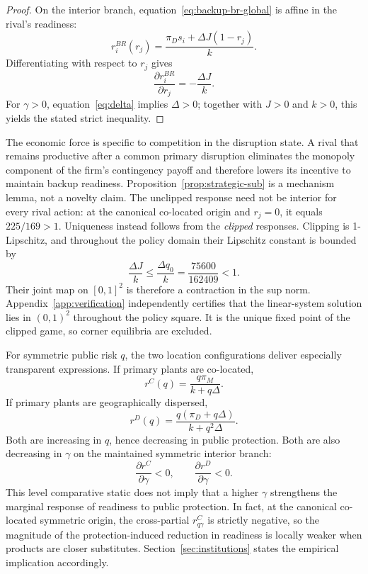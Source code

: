 \begin{proof}
On the interior branch, equation~\eqref{eq:backup-br-global} is affine in the rival's readiness:
\[
r_i^{BR}(r_j)
=
\frac{\pi_D s_i+\Delta J(1-r_j)}{k}.
\]
Differentiating with respect to $r_j$ gives
\[
\frac{\partial r_i^{BR}}{\partial r_j}
=
-\frac{\Delta J}{k}.
\]
For $\gamma>0$, equation~\eqref{eq:delta} implies $\Delta>0$; together with $J>0$ and $k>0$, this yields the stated strict inequality.
\end{proof}

The economic force is specific to competition in the disruption state. A rival that remains productive after a common primary disruption eliminates the monopoly component of the firm's contingency payoff and therefore lowers its incentive to maintain backup readiness. Proposition~\ref{prop:strategic-sub} is a mechanism lemma, not a novelty claim. The unclipped response need not be interior for every rival action: at the canonical co-located origin and $r_j=0$, it equals $225/169>1$. Uniqueness instead follows from the \emph{clipped} responses. Clipping is 1-Lipschitz, and throughout the policy domain their Lipschitz constant is bounded by
\begin{equation}
\frac{\Delta J}{k}\leq\frac{\Delta q_0}{k}
=\frac{75600}{162409}<1.
\label{eq:backup-contraction-bound}
\end{equation}
Their joint map on $[0,1]^2$ is therefore a contraction in the sup norm. Appendix~\ref{app:verification} independently certifies that the linear-system solution lies in $(0,1)^2$ throughout the policy square. It is the unique fixed point of the clipped game, so corner equilibria are excluded.

For symmetric public risk $q$, the two location configurations deliver especially transparent expressions. If primary plants are co-located,
\begin{equation}
r^C(q)=\frac{q\pi_M}{k+q\Delta}.
\label{eq:rC}
\end{equation}
If primary plants are geographically dispersed,
\begin{equation}
r^D(q)=\frac{q(\pi_D+q\Delta)}{k+q^2\Delta}.
\label{eq:rD}
\end{equation}
Both are increasing in $q$, hence decreasing in public protection. Both are also decreasing in $\gamma$ on the maintained symmetric interior branch:
\begin{equation}
\frac{\partial r^C}{\partial \gamma}<0,
\qquad
\frac{\partial r^D}{\partial \gamma}<0.
\label{eq:gamma-r}
\end{equation}
This level comparative static does not imply that a higher $\gamma$ strengthens the marginal response of readiness to public protection. In fact, at the canonical co-located symmetric origin, the cross-partial $r^C_{q\gamma}$ is strictly negative, so the magnitude of the protection-induced reduction in readiness is locally weaker when products are closer substitutes. Section~\ref{sec:institutions} states the empirical implication accordingly.

